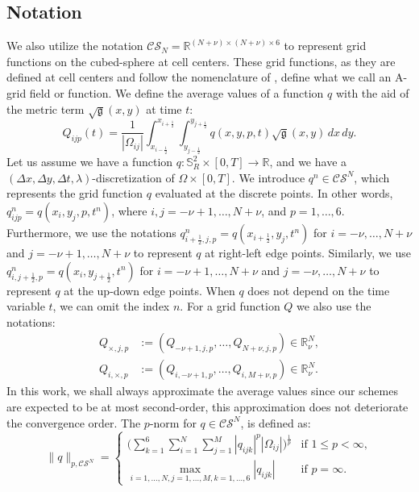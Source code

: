 \subsection{Notation}
\label{cs-notation}
We also utilize the notation $\mathcal{CS}_N=\mathbb{R}^{(N+\nu)\times(N+\nu)\times 6}$
to represent grid functions on the cubed-sphere at cell centers.
These grid functions, as they are defined at cell centers and follow the nomenclature of \citet{arakawa:1977}, define what we call an A-grid field or function.
We define the average values of a function $q$ with the aid of the metric term
$\sqrt{\mathfrak{g}}(x,y)$ at time $t$: 
\begin{equation}
	\label{qav-sphere}
	Q_{ijp}(t) = \frac{1}{|\Omega_{ij}|}\int_{x_{i-\frac{1}{2}}}^{x_{i+\frac{1}{2}}}
	\int_{y_{j-\frac{1}{2}}}^{y_{j+\frac{1}{2}}}  q(x,y,p,t) {\sqrt{\mathfrak{g}}(x,y)}\,dx \,dy.
\end{equation}
Let us assume we have a function $q:\mathbb{S}^2_R\times[0,T] \to \mathbb{R}$, 
and we have a $(\Delta x, \Delta y, \Delta t, \lambda)$-discretization of $\Omega \times [0,T]$.
We introduce $q^n \in \mathcal{CS}^N$, which represents the grid function $q$
evaluated at the discrete points. 
In other words, $q^n_{ijp} = q(x_i,y_j,p,t^n)$, where $i,j=-\nu +1, \ldots, N+\nu$, and $p=1, \ldots, 6$.
Furthermore, we use the notations $q^n_{i+\frac{1}{2},j,p} = q(x_{i+\frac{1}{2}},y_j, t^n)$ 
for $i=-\nu, \ldots, N+\nu$ and $j=-\nu +1, \ldots, N+\nu$ to represent $q$ at right-left edge points.
Similarly, we use $q^n_{i,j+\frac{1}{2},p} = q(x_i,y_{j+\frac{1}{2}},t^n)$ for $i=-\nu +1, \ldots, N+\nu$ and $j=-\nu, \ldots, N+\nu$ to represent $q$ at the
up-down edge points.
When $q$ does not depend on the time variable $t$, we can omit the index $n$.
For a grid function $Q$ we also use the notations:
\begin{align*}
	Q_{\times,j,p} &:= (Q_{-\nu+1,j,p}, \ldots, Q_{N+\nu,j,p}) \in \mathbb{R}^{N}_{\nu},\\
	Q_{i,\times,p} &:= (Q_{i,-\nu+1,p}, \ldots, Q_{i,M+\nu,p}) \in \mathbb{R}^{N}_{\nu}.
\end{align*}
In this work, we shall always approximate the average values since our schemes are expected to be at most second-order,
this approximation does not deteriorate the convergence order.
The $p$-norm for $q \in \mathcal{CS}^N$, is defined as:
\begin{equation}
	\label{chp-advcs-pnorm}
	\|q\|_{p, \mathcal{CS}^N}=
	\begin{cases}
		\bigg( \sum_{k=1}^{6} \sum_{i=1}^{N} \sum_{j=1}^{M}|q_{ijk}|^p |\Omega_{ij}|\bigg)^{\frac{1}{p}} & \text{if } 1\leq p < \infty,\\
		\max_{i=1, \ldots, N,j=1,\ldots,M,k=1,\ldots,6}{|q_{ijk}|} & \text{if } p=\infty.
	\end{cases}
\end{equation}


